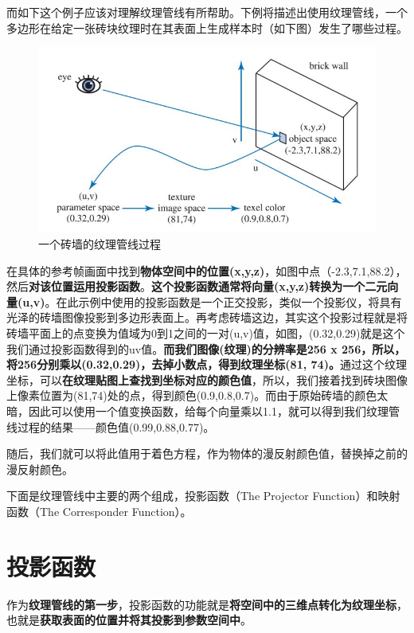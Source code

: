 \documentclass[UTF8,a4paper,12pt]{ctexbook}
\begin{document}
		而如下这个例子应该对理解纹理管线有所帮助。下例将描述出使用纹理管线，一个多边形在给定一张砖块纹理时在其表面上生成样本时（如下图）发生了哪些过程。
			\begin{figure}[H]
				\centering
				\includegraphics[scale=0.67]{TexturePipeline2}
				\caption{一个砖墙的纹理管线过程}
			\end{figure}
		
		在具体的参考帧画面中找到\textbf{物体空间中的位置(x,y,z)}，如图中点（-2.3,7.1,88.2），然后\textbf{对该位置运用投影函数}。\color{blue}\textbf{这个投影函数通常将向量(x,y,z)转换为一个二元向量(u,v)}\color{black}。在此示例中使用的投影函数是一个正交投影，类似一个投影仪，将具有光泽的砖墙图像投影到多边形表面上。再考虑砖墙这边，其实这个投影过程就是将砖墙平面上的点变换为值域为0到1之间的一对(u,v)值，如图，(0.32,0.29)就是这个我们通过投影函数得到的uv值。\textbf{而我们图像(纹理)的分辨率是256 x 256，所以，将256分别乘以(0.32,0.29)，去掉小数点，得到纹理坐标(81, 74)。}通过这个纹理坐标，可以\textbf{在纹理贴图上查找到坐标对应的颜色值}，所以，我们接着找到砖块图像上像素位置为(81,74)处的点，得到颜色(0.9,0.8,0.7)。而由于原始砖墙的颜色太暗，因此可以使用一个值变换函数，给每个向量乘以1.1，就可以得到我们纹理管线过程的结果——颜色值(0.99,0.88,0.77)。
		
		随后，我们就可以将此值用于着色方程，作为物体的漫反射颜色值，替换掉之前的漫反射颜色。
		
		下面是纹理管线中主要的两个组成，投影函数（The Projector Function）和映射函数（The Corresponder Function）。
			
	\section{投影函数}
		作为\textbf{纹理管线的第一步}，投影函数的功能就是\textbf{将空间中的三维点转化为纹理坐标}，也就是\textbf{获取表面的位置并将其投影到参数空间中}。
		
\end{document}
